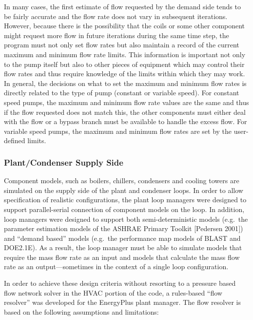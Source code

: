 In many cases, the first estimate of flow requested by the demand side tends to be fairly accurate and the flow rate does not vary in subsequent iterations. However, because there is the possibility that the coils or some other component might request more flow in future iterations during the same time step, the program must not only set flow rates but also maintain a record of the current maximum and minimum flow rate limits. This information is important not only to the pump itself but also to other pieces of equipment which may control their flow rates and thus require knowledge of the limits within which they may work. In general, the decisions on what to set the maximum and minimum flow rates is directly related to the type of pump (constant or variable speed). For constant speed pumps, the maximum and minimum flow rate values are the same and thus if the flow requested does not match this, the other components must either deal with the flow or a bypass branch must be available to handle the excess flow. For variable speed pumps, the maximum and minimum flow rates are set by the user-defined limits.

\subsubsection{Plant/Condenser Supply Side}\label{plantcondenser-supply-side}

Component models, such as boilers, chillers, condensers and cooling towers are simulated on the supply side of the plant and condenser loops. In order to allow specification of realistic configurations, the plant loop managers were designed to support parallel-serial connection of component models on the loop. In addition, loop managers were designed to support both semi-deterministic models (e.g.~the parameter estimation models of the ASHRAE Primary Toolkit {[}Pedersen 2001{]}) and ``demand based'' models (e.g.~the performance map models of BLAST and DOE2.1E). As a result, the loop manager must be able to simulate models that require the mass flow rate as an input and models that calculate the mass flow rate as an output---sometimes in the context of a single loop configuration.

In order to achieve these design criteria without resorting to a pressure based flow network solver in the HVAC portion of the code, a rules-based ``flow resolver'' was developed for the EnergyPlus plant manager. The flow resolver is based on the following assumptions and limitations:

